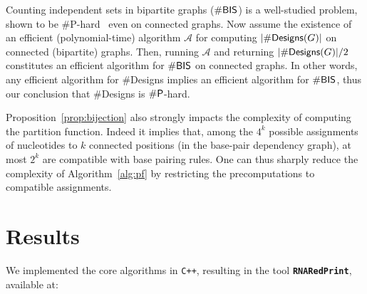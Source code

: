 \documentclass[]{bmcart}
\newenvironment{proof}[1][]{\noindent Proof\ifthenelse{\equal{#1}{}}{}{ (#1)}.~}{}
\newcommand{\Design}[1]{{\sf Designs}^{\star}(#1)}
\newcommand{\NumDesign}{\ensuremath{\#}{\sf Designs}\xspace}
\newcommand{\IS}[1]{{\sf IndSets}(#1)}
\newcommand{\ourprog}{{\tt \bfseries{}\color{black!85}RNA\textcolor{red!70!black}{Red}Print}}
\newcommand{\citep}[1]{\cite{#1}}
\newcommand{\revised}[1]{{\color{red} #1}}
\begin{document}
Counting independent sets in bipartite graphs ($\#{\sf BIS}$) is a well-studied problem, shown to be \#{\sf P}-hard~\citep{Ge2012} even on connected graphs. Now assume the existence of an efficient (polynomial-time) algorithm $\mathcal{A}$ for computing $|\NumDesign(G)|$ on connected (bipartite) graphs. Then, running $\mathcal{A}$ and returning $|\NumDesign(G)|/2$ constitutes an efficient algorithm for $\#{\sf BIS}$ on connected graphs.
In other words, any efficient algorithm for \NumDesign implies an efficient algorithm for $\#{\sf BIS}$, thus our conclusion that \NumDesign is $\#{\sf P}$-hard. 

\revised{Proposition~\ref{prop:bijection} also strongly impacts the complexity of computing the partition function. Indeed it implies that, among the $4^k$ possible assignments of nucleotides to $k$ connected positions (in the base-pair dependency graph), at most $2^k$ are compatible with base pairing rules. One can thus sharply reduce the complexity of Algorithm~\ref{alg:pf} by restricting the precomputations to compatible assignments.}






\section*{Results}\label{sec:results}

We implemented the core algorithms in \texttt{C++}, resulting in the tool
\ourprog{}, available at: 
\end{document}
